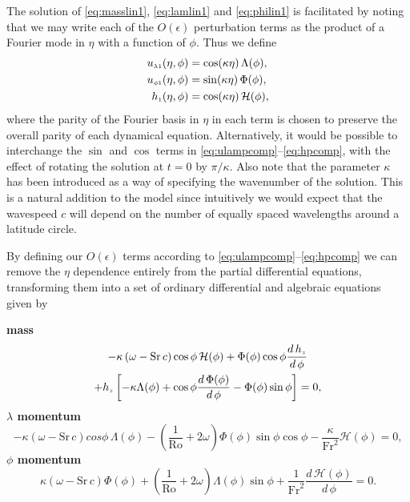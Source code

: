 The solution of \eqref{eq:masslin1}, \eqref{eq:lamlin1} and \eqref{eq:philin1} is facilitated by noting that we may write each of the $O(\epsilon)$ perturbation terms as the product of a Fourier mode in $\eta$ with a function of $\phi$. Thus we define
\begin{align}
{\ensuremath{u_{\scriptscriptstyle \lambda 1}}}(\eta,\phi) &= \cos(\kappa\eta)\,\Lambda(\phi),\label{eq:ulampcomp}\\
{u_{\scriptscriptstyle \phi 1}}(\eta,\phi) &= \sin(\kappa\eta)\,\Phi(\phi),\label{eq:uphipcomp}\\
{h_{\scriptscriptstyle 1}}(\eta,\phi) &= \cos(\kappa\eta)\,\mathcal{H}(\phi),\label{eq:hpcomp}
\end{align}
where the parity of the Fourier basis in $\eta$ in each term is chosen to preserve the overall parity of each dynamical equation. Alternatively, it would be possible to interchange the $\sin$ and $\cos$ terms in \eqref{eq:ulampcomp}--\eqref{eq:hpcomp}, with the effect of rotating the solution at $t=0$ by $\pi/\kappa$. Also note that the parameter $\kappa$ has been introduced as a way of specifying the wavenumber of the solution. This is a natural addition to the model since intuitively we would expect that the wavespeed $c$ will depend on the number of equally spaced wavelengths around a latitude circle.

By defining our $O(\epsilon)$ terms according to \eqref{eq:ulampcomp}--\eqref{eq:hpcomp} we can remove the $\eta$ dependence entirely from the partial differential equations, transforming them into a set of ordinary differential and algebraic equations given by

{\bfseries mass}
\begin{multline}
-\kappa\left(\omega-\mathrm{Sr}\,c\right)\cos\phi \, \mathcal{H}(\phi) + \Phi(\phi)\cos\phi\frac{d \, {h_{\scriptscriptstyle z}}}{d \, \phi}\\+{h_{\scriptscriptstyle z}}\left[-\kappa\Lambda(\phi)+\cos\phi\frac{d \, \Phi(\phi)}{d\,\phi}-\Phi(\phi)\sin\phi\right]=0, \label{eq:masslin2}
\end{multline}
{\bfseries \boldmath$\lambda$ momentum}
\begin{equation}
-\kappa\left(\omega-\mathrm{Sr}\,c\right)cos\phi \,\Lambda(\phi) - \left(\frac{1}{\mathrm{Ro}} + 2\omega\right)\Phi(\phi)\sin\phi\cos\phi - \frac{\kappa}{\mathrm{Fr}^2}\mathcal{H}(\phi) = 0, \label{eq:lamlin2}
\end{equation}
{\bfseries \boldmath$\phi$ momentum}
\begin{equation}
\kappa\left(\omega-\mathrm{Sr}\,c\right)\Phi(\phi) + \left(\frac{1}{\mathrm{Ro}} + 2\omega \right)\Lambda(\phi)\sin\phi + \frac{1}{\mathrm{Fr}^2}\frac{d \, \mathcal{H}(\phi)}{d\,\phi} = 0. \label{eq:philin2}
\end{equation}

